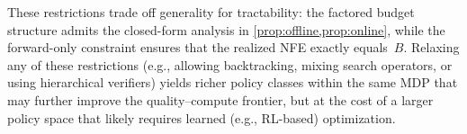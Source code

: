 These restrictions trade off generality for tractability: the factored
budget structure admits the closed-form analysis in
\cref{prop:offline,prop:online}, while the forward-only constraint
ensures that the realized NFE exactly equals~$B$.
Relaxing any of these restrictions (e.g., allowing backtracking,
mixing search operators, or using hierarchical verifiers) yields
richer policy classes within the same MDP that may further improve the
quality--compute frontier, but at the cost of a larger policy space
that likely requires learned (e.g., RL-based) optimization.
